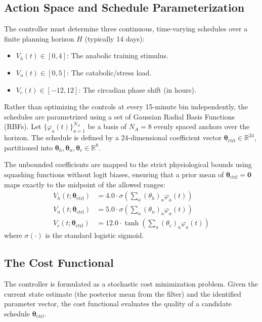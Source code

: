 \documentclass[11pt,a4paper]{article}
\begin{document}
\subsection{Action Space and Schedule Parameterization}

The controller must determine three continuous, time-varying schedules over a finite planning horizon $H$ (typically 14 days):
\begin{itemize}
    \item $V_h(t) \in [0, 4]$: The anabolic training stimulus.
    \item $V_n(t) \in [0, 5]$: The catabolic/stress load.
    \item $V_c(t) \in [-12, 12]$: The circadian phase shift (in hours).
\end{itemize}

Rather than optimizing the controls at every 15-minute bin independently, the schedules are parametrized using a set of Gaussian Radial Basis Functions (RBFs). Let $\{\varphi_a(t)\}_{a=1}^{N_A}$ be a basis of $N_A = 8$ evenly spaced anchors over the horizon. The schedule is defined by a 24-dimensional coefficient vector $\boldsymbol{\theta}_{\text{ctrl}} \in \mathbb{R}^{24}$, partitioned into $\boldsymbol{\theta}_h, \boldsymbol{\theta}_n, \boldsymbol{\theta}_c \in \mathbb{R}^8$. 

The unbounded coefficients are mapped to the strict physiological bounds using squashing functions without logit biases, ensuring that a prior mean of $\boldsymbol{\theta}_{\text{ctrl}} = \mathbf{0}$ maps exactly to the midpoint of the allowed ranges:
\begin{align*}
V_h(t; \boldsymbol{\theta}_{\text{ctrl}}) &= 4.0 \cdot \sigma\left( \sum_a (\theta_h)_a \varphi_a(t) \right) \\
V_n(t; \boldsymbol{\theta}_{\text{ctrl}}) &= 5.0 \cdot \sigma\left( \sum_a (\theta_n)_a \varphi_a(t) \right) \\
V_c(t; \boldsymbol{\theta}_{\text{ctrl}}) &= 12.0 \cdot \tanh\left( \sum_a (\theta_c)_a \varphi_a(t) \right)
\end{align*}
where $\sigma(\cdot)$ is the standard logistic sigmoid.

\subsection{The Cost Functional}

The controller is formulated as a stochastic cost minimization problem. Given the current state estimate (the posterior mean from the filter) and the identified parameter vector, the cost functional evaluates the quality of a candidate schedule $\boldsymbol{\theta}_{\text{ctrl}}$.
\end{document}
